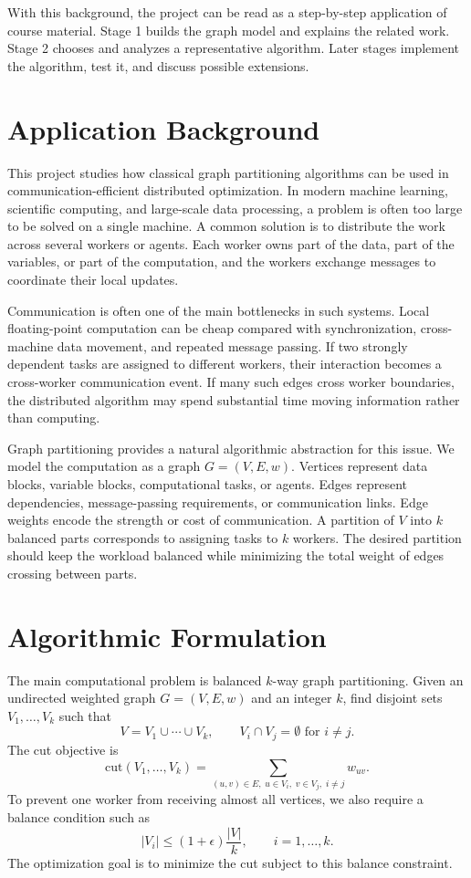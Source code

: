 \documentclass[11pt]{article}
\begin{document}
With this background, the project can be read as a step-by-step application of
course material. Stage 1 builds the graph model and explains the related work.
Stage 2 chooses and analyzes a representative algorithm. Later stages implement
the algorithm, test it, and discuss possible extensions.

\section{Application Background}

This project studies how classical graph partitioning algorithms can be used in
communication-efficient distributed optimization. In modern machine learning,
scientific computing, and large-scale data processing, a problem is often too
large to be solved on a single machine. A common solution is to distribute the
work across several workers or agents. Each worker owns part of the data, part
of the variables, or part of the computation, and the workers exchange messages
to coordinate their local updates.

Communication is often one of the main bottlenecks in such systems. Local
floating-point computation can be cheap compared with synchronization,
cross-machine data movement, and repeated message passing. If two strongly
dependent tasks are assigned to different workers, their interaction becomes a
cross-worker communication event. If many such edges cross worker boundaries,
the distributed algorithm may spend substantial time moving information rather
than computing.

Graph partitioning provides a natural algorithmic abstraction for this issue.
We model the computation as a graph $G=(V,E,w)$. Vertices represent data
blocks, variable blocks, computational tasks, or agents. Edges represent
dependencies, message-passing requirements, or communication links. Edge
weights encode the strength or cost of communication. A partition of $V$ into
$k$ balanced parts corresponds to assigning tasks to $k$ workers. The desired
partition should keep the workload balanced while minimizing the total weight
of edges crossing between parts.

\section{Algorithmic Formulation}

The main computational problem is balanced $k$-way graph partitioning. Given an
undirected weighted graph $G=(V,E,w)$ and an integer $k$, find disjoint sets
$V_1,\ldots,V_k$ such that
\[
    V = V_1 \cup \cdots \cup V_k,
    \qquad V_i \cap V_j = \emptyset \text{ for } i\neq j.
\]
The cut objective is
\[
    \mathrm{cut}(V_1,\ldots,V_k)
    =
    \sum_{(u,v)\in E,\; u\in V_i,\; v\in V_j,\; i\neq j} w_{uv}.
\]
To prevent one worker from receiving almost all vertices, we also require a
balance condition such as
\[
    |V_i| \leq (1+\epsilon)\frac{|V|}{k},
    \qquad i=1,\ldots,k.
\]
The optimization goal is to minimize the cut subject to this balance
constraint.
\end{document}
